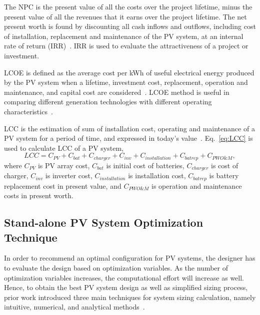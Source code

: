 \documentclass[review]{elsarticle}
\begin{document}
The NPC is the present value of all the costs over the project lifetime, minus the present value of all the revenues that it earns over the project lifetime. The net present worth is found by discounting all cash inflows and outflows, including cost of installation, replacement and maintenance of the PV system, at an internal rate of return (IRR)~\cite{Park2004}.  IRR is used to evaluate the attractiveness of a project or investment.

LCOE is defined as the average cost per kWh of useful electrical energy produced by the PV system when a lifetime, investment cost, replacement, operation and maintenance, and capital cost are considered~\cite{Kamel2005}. LCOE method is useful in comparing different generation technologies with different operating characteristics~\cite{Zhou2010}.

LCC is the estimation of sum of installation cost, operating and maintenance of a PV system for a period of time, and expressed in today's value~\cite{Applasamy2011}. Eq.~\eqref{eq:LCC} is used to calculate LCC of a PV system,
%
\begin{equation}
\label{eq:LCC}
LCC = C_{PV} + C_{bat} + C_{charger} + C_{inv} + C_{installation} + C_{batrep} + C_{PWO\&M},
\end{equation}
\noindent where $C_{PV}$ is PV array cost, $C_{bat}$ is initial cost of batteries, $C_{charger}$ is cost of charger, $C_{inv}$ is inverter cost, $C_{installation}$ is installation cost, $C_{batrep}$ is battery replacement cost in present value, and $C_{PWO\&M}$ is operation and maintenance costs 
in present worth.

\subsection{Stand-alone PV System Optimization Technique}

In order to recommend an optimal configuration for PV systems, 
the designer has to evaluate the design based on optimization variables. 
As the number of optimization variables increases, the computational effort 
will increase as well. Hence, to obtain the best PV system design as well as 
simplified sizing process, prior work introduced three main techniques 
for system sizing calculation, namely intuitive, numerical, and analytical methods~\cite{Zhou2010}.
\end{document}

